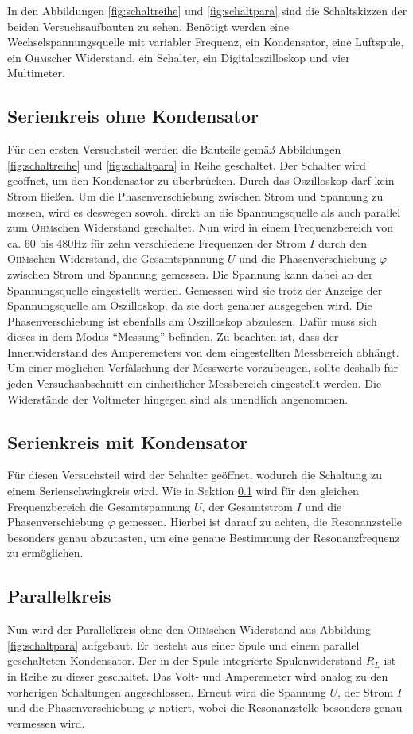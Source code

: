 \documentclass[12pt,a4paper,titlepage,headinclude]{scrartcl}
\numberwithin{equation}{subsection}
\newcommand{\person}[1]{\textsc{#1}}
\begin{document}
In den Abbildungen \ref{fig:schaltreihe} und \ref{fig:schaltpara} sind die Schaltskizzen der beiden Versuchsaufbauten zu sehen. Benötigt werden eine Wechselspannungsquelle mit variabler Frequenz, ein Kondensator, eine Luftspule, ein \person{Ohm}scher Widerstand, ein Schalter, ein Digitaloszilloskop und vier Multimeter. 
\subsection{Serienkreis ohne Kondensator}
\label{sec:serie1}
Für den ersten Versuchsteil werden die Bauteile gemäß Abbildungen \ref{fig:schaltreihe} und \ref{fig:schaltpara} in Reihe geschaltet. Der Schalter wird geöffnet, um den Kondensator zu überbrücken. Durch das Oszilloskop darf kein Strom fließen. Um die Phasenverschiebung zwischen Strom und Spannung zu messen, wird es deswegen sowohl direkt an die Spannungsquelle als auch parallel zum \person{Ohm}schen Widerstand geschaltet. Nun wird in einem Frequenzbereich von ca. 60 bis 480\;Hz für zehn verschiedene Frequenzen der Strom $I$ durch den \person{Ohm}schen Widerstand, die Gesamtspannung $U$ und die Phasenverschiebung  $\varphi$ zwischen Strom und Spannung gemessen. Die Spannung kann dabei an der Spannungsquelle eingestellt werden. Gemessen wird sie trotz der Anzeige der Spannungsquelle am Oszilloskop, da sie dort genauer ausgegeben wird. Die Phasenverschiebung ist ebenfalls am Oszilloskop abzulesen. Dafür muss sich dieses in dem Modus "`Messung"' befinden. Zu beachten ist, dass der Innenwiderstand des Amperemeters von dem eingestellten Messbereich abhängt. Um einer möglichen Verfälschung der Messwerte vorzubeugen, sollte deshalb für jeden Versuchsabschnitt ein einheitlicher Messbereich eingestellt werden. Die Widerstände der Voltmeter hingegen sind als unendlich angenommen.

\subsection{Serienkreis mit Kondensator}
Für diesen Versuchsteil wird der Schalter geöffnet, wodurch die Schaltung zu einem Serienschwingkreis wird. Wie in Sektion \ref{sec:serie1} wird für den gleichen Frequenzbereich die Gesamtspannung $U$, der Gesamtstrom $I$ und die Phasenverschiebung $\varphi$ gemessen. Hierbei ist darauf zu achten, die Resonanzstelle besonders genau abzutasten, um eine genaue Bestimmung der Resonanzfrequenz zu ermöglichen.

\subsection{Parallelkreis}
Nun wird der Parallelkreis ohne den \person{Ohm}schen Widerstand aus Abbildung \ref{fig:schaltpara} aufgebaut. Er besteht aus einer Spule  und einem parallel geschalteten Kondensator. Der in der Spule integrierte Spulenwiderstand $R_L$ ist in Reihe zu dieser geschaltet. Das Volt- und Amperemeter wird analog zu den vorherigen Schaltungen angeschlossen. Erneut wird die Spannung $U$, der Strom $I$ und die Phasenverschiebung $\varphi$ notiert, wobei die Resonanzstelle besonders genau vermessen wird.
\end{document}

